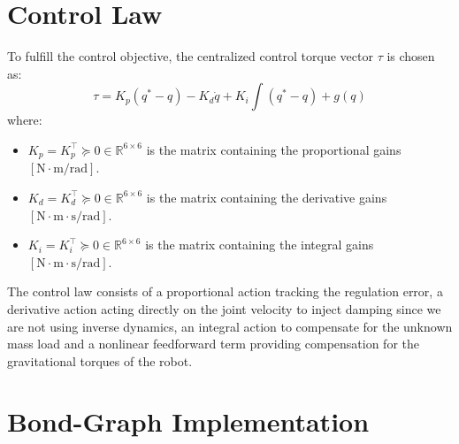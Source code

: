 \section{Control Law}

To fulfill the control objective, the centralized control torque vector $\tau$ is chosen as:
\begin{equation}
  \tau = K_p (q^* - q) - K_d \dot{q} + K_i \int{(q^* - q)} + g(q)
  \label{eq:pd_control_law}
\end{equation}
where:
\begin{itemize}
  \item $K_p = K_p^\top \succeq 0 \in \mathbb{R}^{6\times6} $ is the matrix containing the proportional gains $[\text{N}\cdot\text{m/rad}]$.
  \item $K_d = K_d^\top \succeq 0 \in \mathbb{R}^{6\times6}$ is the matrix containing the derivative gains $[\text{N}\cdot\text{m}\cdot\text{s/rad}]$.
  \item $K_i = K_i^\top \succeq 0 \in \mathbb{R}^{6\times6}$ is the matrix containing the integral gains $[\text{N}\cdot\text{m}\cdot\text{s/rad}]$.
\end{itemize}
The control law consists of a proportional action tracking the regulation error, a derivative action acting directly on the joint velocity to inject damping since we are not using inverse dynamics, an integral action to compensate for the unknown mass load and a nonlinear feedforward term providing compensation for the gravitational torques of the robot.

\section{Bond-Graph Implementation}

